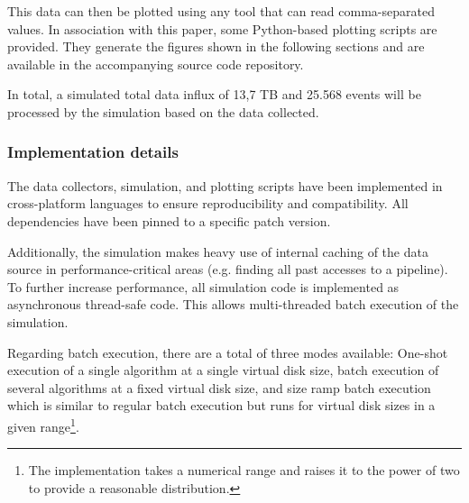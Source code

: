     This data can then be plotted using any tool that can read comma-separated values. In association with this paper, some Python-based plotting scripts are provided. They generate the figures shown in the following sections and are available in the accompanying source code repository.
    
    In total, a simulated total data influx of 13,7 TB and 25.568 events will be processed by the simulation based on the data collected.

\subsubsection{Implementation details}
    The data collectors, simulation, and plotting scripts have been implemented in cross-platform languages to ensure reproducibility and compatibility. All dependencies have been pinned to a specific patch version.
    
    Additionally, the simulation makes heavy use of internal caching of the data source in performance-critical areas (e.g. finding all past accesses to a pipeline). To further increase performance, all simulation code is implemented as asynchronous thread-safe code. This allows multi-threaded batch execution of the simulation.
    
    Regarding batch execution, there are a total of three modes available: One-shot execution of a single algorithm at a single virtual disk size, batch execution of several algorithms at a fixed virtual disk size, and size ramp batch execution which is similar to regular batch execution but runs for virtual disk sizes in a given range\footnote{The implementation takes a numerical range and raises it to the power of two to provide a reasonable distribution.}.
